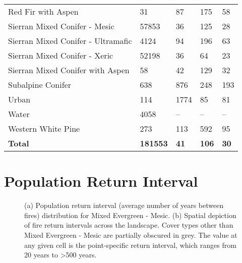 \begin{table}[!htbp]
\begin{tabular}{@{}lllll@{}}
Red Fir with Aspen     			& 31       & 87        & 175      & 58  \\
Sierran Mixed Conifer - Mesic  		& 57853    & 36        & 125      & 28  \\
Sierran Mixed Conifer - Ultramafic  & 4124     & 94        & 196      & 63     \\
Sierran Mixed Conifer - Xeric   	& 52198    & 36        & 64       & 23 \\
Sierran Mixed Conifer with Aspen  	& 58       & 42        & 129      & 32   \\
Subalpine Conifer   			 & 638      & 876       & 248      & 193      \\
Urban 							 & 114      & 1774      & 85       & 81       \\
Water 							 & 4058     & --       & --      & --      \\
Western White Pine    			 & 273      & 113       & 592      & 95       \\
\textbf{Total}       			& \textbf{181553}    & \textbf{41}   & \textbf{106}   & \textbf{30}                                                                                \\ \bottomrule
\end{tabular}
\end{table}


\section{Population Return Interval}

\begin{figure}[!htbp]
  \centering
  \caption{(a) Population return interval (average number of years between fires) distribution for Mixed Evergreen - Mesic. (b) Spatial depiction of fire return intervals across the landscape. Cover types other than Mixed Evergreen - Mesic are partially obscured in grey. The value at any given cell is the point-specific return interval, which ranges from 20 years to \textgreater 500 years.}
    \label{fig:preturn_megm}
\end{figure}

